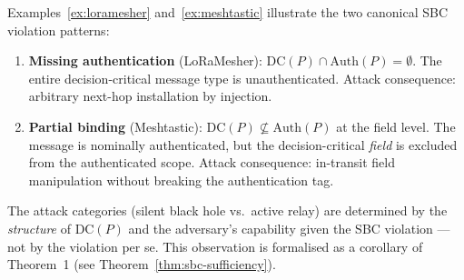 \begin{remark}
\label{rem:taxonomy}
Examples~\ref{ex:loramesher} and~\ref{ex:meshtastic} illustrate the
two canonical SBC violation patterns:
\begin{enumerate}[label=(\roman*)]
  \item \textbf{Missing authentication} (LoRaMesher): $\mathrm{DC}(P) \cap \mathrm{Auth}(P) = \emptyset$.
        The entire decision-critical message type is unauthenticated.
        Attack consequence: arbitrary next-hop installation by injection.
  \item \textbf{Partial binding} (Meshtastic): $\mathrm{DC}(P) \not\subseteq \mathrm{Auth}(P)$
        at the field level.  The message is nominally authenticated, but the
        decision-critical \emph{field} is excluded from the authenticated scope.
        Attack consequence: in-transit field manipulation without breaking
        the authentication tag.
\end{enumerate}
The attack categories (silent black hole vs.\ active relay) are determined
by the \emph{structure} of $\mathrm{DC}(P)$ and the adversary's
capability given the SBC violation — not by the violation per se.
This observation is formalised as a corollary of Theorem~1
(see Theorem~\ref{thm:sbc-sufficiency}).
\end{remark}
